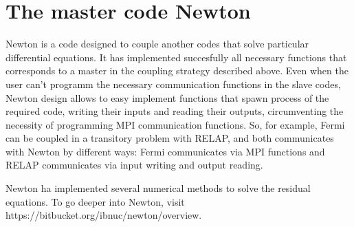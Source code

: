 \section{The master code Newton}
Newton is a code designed to couple another codes that solve particular differential equations.
It has implemented succesfully all necessary functions that corresponds to a master in the coupling strategy described above.
Even when the user can't programm the necessary communication functions in the slave codes,
Newton design allows to easy implement functions that spawn process of the required code,
writing their inputs and reading their outputs,
circumventing the necessity of programming MPI communication functions.
So, for example, Fermi can be coupled in a transitory problem with RELAP,
and both communicates with Newton by different ways:
Fermi communicates via MPI functions and RELAP communicates via input writing and output reading.

Newton ha implemented several numerical methods to solve the residual equations.
To go deeper into Newton, visit https://bitbucket.org/ibnuc/newton/overview.

